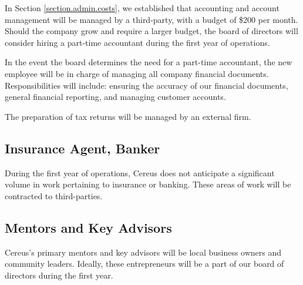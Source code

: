 In Section \ref{section.admin.costs}, we established that accounting and account management will be managed by a third-party, with a budget of \$200 per month. Should the company grow and require a larger budget, the board of directors will consider hiring a part-time accountant during the first year of operations.

In the event the board determines the need for a part-time accountant, the new employee will be in charge of managing all company financial documents. Responsibilities will include: ensuring the accuracy of our financial documents, general financial reporting, and managing customer accounts.

The preparation of tax returns will be managed by an external firm.

\subsection{Insurance Agent, Banker}

During the first year of operations, Cereus does not anticipate a significant volume in work pertaining to insurance or banking. These areas of work will be contracted to third-parties.

\subsection{Mentors and Key Advisors}

Cereus's primary mentors and key advisors will be local business owners and community leaders. Ideally, these entrepreneurs will be a part of our board of directors during the first year.